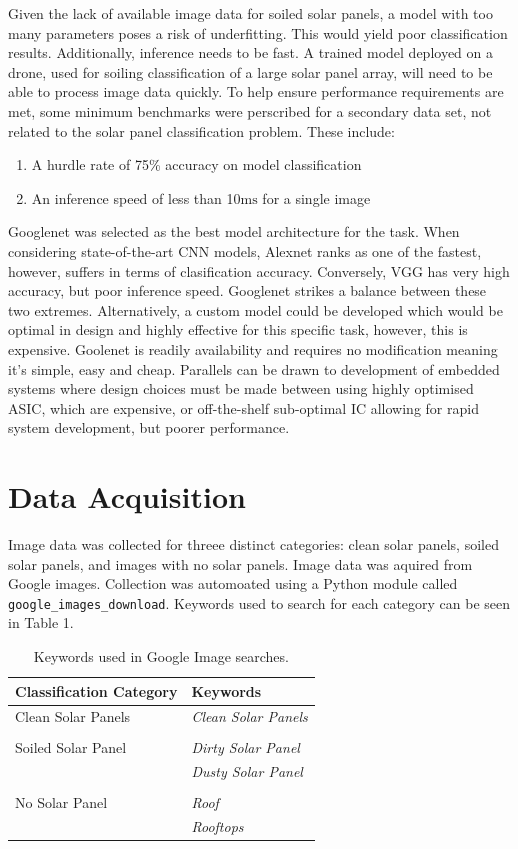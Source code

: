 \documentclass[10pt,journal,compsoc]{IEEEtran}
\begin{document}
		Given the lack of available image data for soiled solar panels, a model with too many parameters poses a risk of underfitting. This would yield poor classification results. Additionally, inference needs to be fast. A trained model deployed on a drone, used for soiling classification of a large solar panel array, will need to be able to process image data quickly. To help ensure performance requirements are met, some minimum benchmarks were perscribed for a secondary data set, not related to the solar panel classification problem. These include:
		\begin{enumerate}
			\item A hurdle rate of 75\% accuracy on model classification
			\item An inference speed of less than 10$\si{\milli\second}$ for a single image
		\end{enumerate}
		
		Googlenet was selected as the best model architecture for the task. When considering state-of-the-art CNN models, Alexnet ranks as one of the fastest, however, suffers in terms of clasification accuracy. Conversely, VGG has very high accuracy, but poor inference speed. Googlenet strikes a balance between these two extremes. Alternatively, a custom model could be developed which would be optimal in design and highly effective for this specific task, however, this is expensive. Goolenet is readily availability and requires no modification meaning it's simple, easy and cheap. Parallels can be drawn to development of embedded systems where design choices must be made between using highly optimised ASIC, which are  expensive, or off-the-shelf sub-optimal IC allowing for rapid system development, but poorer performance.
			
		\section{Data Acquisition}
		Image data was collected for threee distinct categories: clean solar panels, soiled solar panels, and images with no solar panels. Image data was aquired from Google images. Collection was automoated using a Python module called \verb|google_images_download|. Keywords used to search for each category can be seen in Table 1.
		\begin{table}[h]
			\centering
			\caption{Keywords used in Google Image searches.}
			\begin{tabular}{ll}
				\toprule
				\textbf{Classification Category} & \textbf{Keywords} \\
				\midrule
				Clean Solar Panels & \textit{Clean Solar Panels}\\
				 & \\
				Soiled Solar Panel & \textit{Dirty Solar Panel} \\
				 & \textit{Dusty Solar Panel} \\
				  & \\
				No Solar Panel & \textit{Roof} \\
				 & \textit{Rooftops} \\
				\bottomrule
			\end{tabular}
		\end{table}
		
\end{document}
